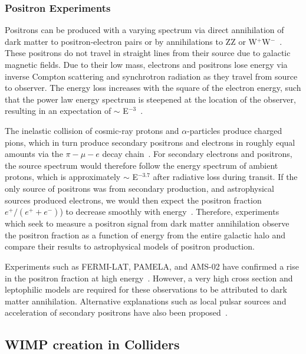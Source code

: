\subsubsection{Positron Experiments}

Positrons can be produced with a varying spectrum via direct annihilation of dark matter to positron-electron pairs or by annihilations to ZZ or W$^+$W$^-$~\cite{Cheng,Kamionkowsk}.  These positrons do not travel in straight lines from their source due to galactic magnetic fields.  Due to their low mass, electrons and positrons lose energy via inverse Compton scattering and synchrotron radiation as they travel from source to observer. The energy loss increases with the square of the electron energy, such that the power law energy spectrum is steepened at the location of the observer, resulting in an expectation of $\sim$ E$^{-3}$~\cite{PEBS}. 

The inelastic collision of cosmic-ray protons and $\alpha$-particles produce charged pions, which in turn produce secondary positrons and electrons in roughly equal amounts via the $\pi-\mu-e$ decay chain~\cite{Stecker}.  For secondary electrons and positrons, the source spectrum would therefore follow the energy spectrum of ambient protons, which is approximately $\sim$ E$^{-3.7}$ after radiative loss during transit.  If the only source of positrons was from secondary production, and astrophysical sources produced electrons, we would then expect the positron fraction $e^+/(e^+ + e^-)$) to decrease smoothly with energy~\cite{PEBS}. Therefore, experiments which seek to measure a positron signal from dark matter annihilation observe the positron fraction as a function of energy from the entire galactic halo and compare their results to astrophysical models of positron production.

Experiments such as FERMI-LAT, PAMELA, and AMS-02 have confirmed a rise in the positron fraction at high energy~\cite{FermiPositron,PamelaPositron,AMSPositron}. However, a very high cross section and leptophilic models are required for these observations to be attributed to dark matter annihilation.  Alternative explanations such as local pulsar sources and acceleration of secondary positrons have also been proposed~\cite{Serpico}.



\subsection{WIMP creation in Colliders}\label{LHCWIMP}

